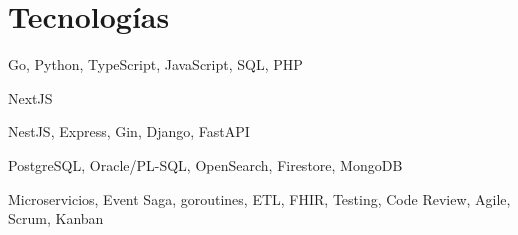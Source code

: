 \section{Tecnologías}
{\small
        \begin{description}[leftmargin=2.5cm, style=sameline, nosep]
                \item[\textbf{Lenguajes}] Go, Python, TypeScript,
                        JavaScript, SQL, PHP
                \item[\textbf{Frontend}] NextJS
                \item[\textbf{Backend}] NestJS, Express, Gin, Django, FastAPI
                \item[\textbf{Datos}] PostgreSQL, Oracle/PL-SQL,
                        OpenSearch, Firestore, MongoDB
                \item[\textbf{Prácticas}] Microservicios, Event Saga,
                        goroutines, ETL, FHIR, Testing, Code Review,
                        Agile, Scrum, Kanban
        \end{description}
}


